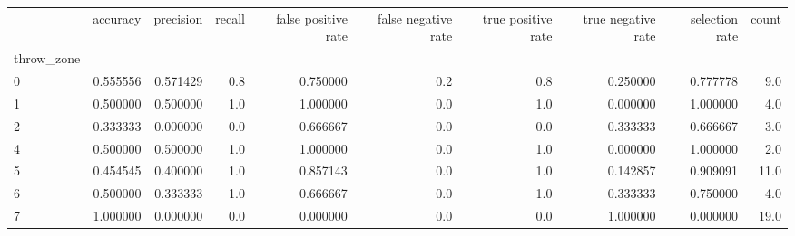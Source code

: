 \begin{tabular}{lrrrrrrrrr}
\toprule
{} &  accuracy &  precision &  recall &  false positive rate &  false negative rate &  true positive rate &  true negative rate &  selection rate &  count \\
throw\_zone &           &            &         &                      &                      &                     &                     &                 &        \\
\midrule
0          &  0.555556 &   0.571429 &     0.8 &             0.750000 &                  0.2 &                 0.8 &            0.250000 &        0.777778 &    9.0 \\
1          &  0.500000 &   0.500000 &     1.0 &             1.000000 &                  0.0 &                 1.0 &            0.000000 &        1.000000 &    4.0 \\
2          &  0.333333 &   0.000000 &     0.0 &             0.666667 &                  0.0 &                 0.0 &            0.333333 &        0.666667 &    3.0 \\
4          &  0.500000 &   0.500000 &     1.0 &             1.000000 &                  0.0 &                 1.0 &            0.000000 &        1.000000 &    2.0 \\
5          &  0.454545 &   0.400000 &     1.0 &             0.857143 &                  0.0 &                 1.0 &            0.142857 &        0.909091 &   11.0 \\
6          &  0.500000 &   0.333333 &     1.0 &             0.666667 &                  0.0 &                 1.0 &            0.333333 &        0.750000 &    4.0 \\
7          &  1.000000 &   0.000000 &     0.0 &             0.000000 &                  0.0 &                 0.0 &            1.000000 &        0.000000 &   19.0 \\
\bottomrule
\end{tabular}
